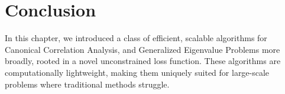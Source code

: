 \section{Conclusion}

In this chapter, we introduced a class of efficient, scalable algorithms for Canonical Correlation Analysis, and Generalized Eigenvalue Problems more broadly, rooted in a novel unconstrained loss function.
These algorithms are computationally lightweight, making them uniquely suited for large-scale problems where traditional methods struggle.
